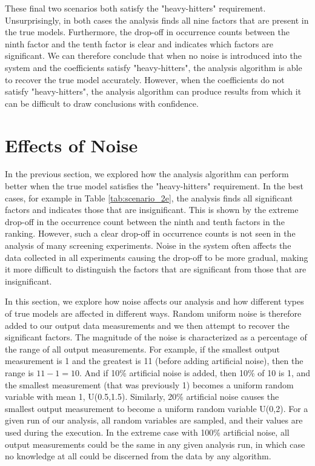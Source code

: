 These final two scenarios both satisfy the "heavy-hitters" requirement.
Unsurprisingly, in both cases the analysis finds all nine factors that are present in the true models.
Furthermore, the drop-off in occurrence counts between the ninth factor and the tenth factor is clear and indicates which factors are significant.
We can therefore conclude that when no noise is introduced into the system and the coefficients satisfy "heavy-hitters", the analysis algorithm is able to recover the true model accurately.
However, when the coefficients do not satisfy "heavy-hitters", the analysis algorithm can produce results from which it can be difficult to draw conclusions with confidence.

\section{Effects of Noise} \label{sect:noise}

In the previous section, we explored how the analysis algorithm can perform better when the true model satisfies the "heavy-hitters" requirement.
In the best cases, for example in Table \ref{tab:scenario_2e}, the analysis finds all significant factors and indicates those that are insignificant.
This is shown by the extreme drop-off in the occurrence count between the ninth and tenth factors in the ranking.
However, such a clear drop-off in occurrence counts is not seen in the analysis of many screening experiments.
Noise in the system often affects the data collected in all experiments causing the drop-off to be more gradual, making it more difficult to distinguish the factors that are significant from those that are insignificant.

In this section, we explore how noise affects our analysis and how different types of true models are affected in different ways.
Random uniform noise is therefore added to our output data measurements and we then attempt to recover the significant factors.
The magnitude of the noise is characterized as a percentage of the range of all output measurements.
For example, if the smallest output measurement is 1 and the greatest is 11 (before adding artificial noise), then the range is $11 - 1 = 10$.
And if 10\% artificial noise is added, then 10\% of 10 is 1, and the smallest measurement (that was previously 1) becomes a uniform random variable with mean 1, U(0.5,1.5).
Similarly, 20\% artificial noise causes the smallest output measurement to become a uniform random variable U(0,2).
For a given run of our analysis, all random variables are sampled, and their values are used during the execution.
In the extreme case with 100\% artificial noise, all output measurements could be the same in any given analysis run, in which case no knowledge at all could be discerned from the data by any algorithm.

